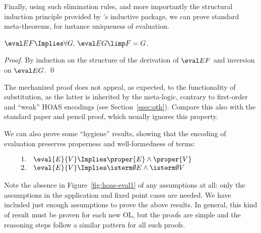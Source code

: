 \documentclass[final]{svjour3}
\begin{document}
Finally, using such elimination rules, and more importantly the structural
induction principle provided by \HOL's inductive package, we can prove
standard meta-theorems, for instance uniqueness of evaluation.
\begin{goal}
$\eval E F \Implies  \forall G.\ \eval E G \limp  F = G$.
\end{goal}
\begin{proof}
  By induction on the structure of the derivation of $\eval E F$ and
  inversion on $\eval E G$.  \qed
\end{proof}

The mechanized proof does not appeal, as expected, to the
functionality of substitution, as the latter is inherited by the meta-logic,
contrary to first-order and ``weak'' HOAS encodings (see
Section~\ref{ssec:oth}).  Compare this also with
the standard paper and pencil proof, which usually ignores this
property.

We can also prove some ``hygiene'' results, showing
that the encoding of evaluation preserves properness and
well-formedness of terms:

\begin{mclemma}
$$\begin{array}{rll}
1. & \eval{E}{V} \Implies \proper{E} \land \proper{V}
     \qquad\qquad\qquad & \\2. & \eval{E}{V} \Implies \isterm\emptyset{E} \land \isterm\emptyset{V}
     \qquad\qquad\qquad & \end{array}$$
\label{mclem:evalproper}
\end{mclemma}
Note the absence in Figure~\ref{fig:hoas-eval1} of any 
assumptions at all: only  the  assumptions in the
application and fixed point
cases are needed.  We have included just enough assumptions to prove the above
results.
In general, this kind of result must be proven for each new OL,
but the proofs are simple and the reasoning steps follow a similar
pattern for all such proofs.
\end{document}
